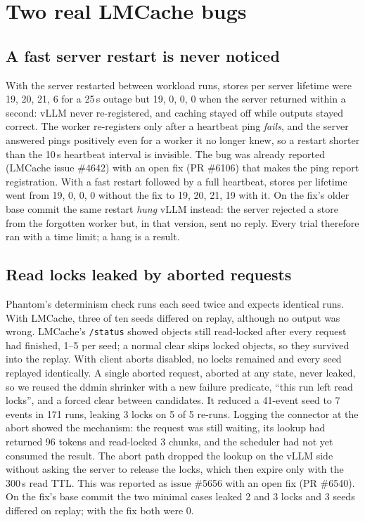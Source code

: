 \documentclass[10pt]{article}
\newcommand{\code}[1]{\texttt{\small #1}}
\begin{document}
\section{Two real LMCache bugs}\label{sec:cases}
\subsection{A fast server restart is never noticed}
With the server restarted between workload runs, stores per server lifetime
were 19, 20, 21, 6 for a 25\,s outage but 19, 0, 0, 0 when the server
returned within a second: vLLM never re-registered, and caching stayed off
while outputs stayed correct. The worker re-registers only after a heartbeat
ping \emph{fails}, and the server answered pings positively even for a
worker it no longer knew, so a restart shorter than the 10\,s heartbeat
interval is invisible. The bug was already reported (LMCache issue \#4642)
with an open fix (PR \#6106) that makes the ping report registration. With a
fast restart followed by a full heartbeat, stores per lifetime went from 19,
0, 0, 0 without the fix to 19, 20, 21, 19 with it. On the fix's older base
commit the same restart \emph{hung} vLLM instead: the server rejected a
store from the forgotten worker but, in that version, sent no reply. Every
trial therefore ran with a time limit; a hang is a result.

\subsection{Read locks leaked by aborted requests}
Phantom's determinism check runs each seed twice and expects identical runs.
With LMCache, three of ten seeds differed on replay, although no output was
wrong. LMCache's \code{/status} showed objects still read-locked after every
request had finished, 1--5 per seed; a normal clear skips locked objects, so
they survived into the replay. With client aborts disabled, no locks
remained and every seed replayed identically. A single aborted request,
aborted at any state, never leaked, so we reused the ddmin shrinker with a
new failure predicate, ``this run left read locks'', and a forced clear
between candidates. It reduced a 41-event seed to 7 events in 171 runs,
leaking 3 locks on 5 of 5 re-runs. Logging the connector at the abort showed
the mechanism: the request was still waiting, its lookup had returned 96
tokens and read-locked 3 chunks, and the scheduler had not yet consumed the
result. The abort path dropped the lookup on the vLLM side without asking the
server to release the locks, which then expire only with the 300\,s read
TTL. This was reported as issue \#5656 with an open fix (PR \#6540). On the
fix's base commit the two minimal cases leaked 2 and 3 locks and 3 seeds
differed on replay; with the fix both were 0.
\end{document}
